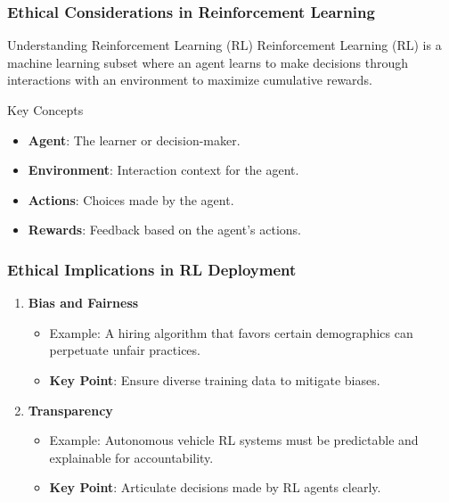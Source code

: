 \documentclass[aspectratio=169]{beamer}
\begin{document}
\begin{frame}[fragile]
    \frametitle{Ethical Considerations in Reinforcement Learning}
    \begin{block}{Understanding Reinforcement Learning (RL)}
        Reinforcement Learning (RL) is a machine learning subset where an agent learns to make decisions through interactions with an environment to maximize cumulative rewards. 
    \end{block}
    
    \begin{block}{Key Concepts}
        \begin{itemize}
            \item \textbf{Agent}: The learner or decision-maker.
            \item \textbf{Environment}: Interaction context for the agent.
            \item \textbf{Actions}: Choices made by the agent.
            \item \textbf{Rewards}: Feedback based on the agent's actions.
        \end{itemize}
    \end{block}
\end{frame}

\begin{frame}[fragile]
    \frametitle{Ethical Implications in RL Deployment}
    \begin{enumerate}
        \item \textbf{Bias and Fairness}
            \begin{itemize}
                \item Example: A hiring algorithm that favors certain demographics can perpetuate unfair practices.
                \item \textbf{Key Point}: Ensure diverse training data to mitigate biases.
            \end{itemize}
        \item \textbf{Transparency}
            \begin{itemize}
                \item Example: Autonomous vehicle RL systems must be predictable and explainable for accountability.
                \item \textbf{Key Point}: Articulate decisions made by RL agents clearly.
            \end{itemize}
    \end{enumerate}
\end{frame}
\end{document}
